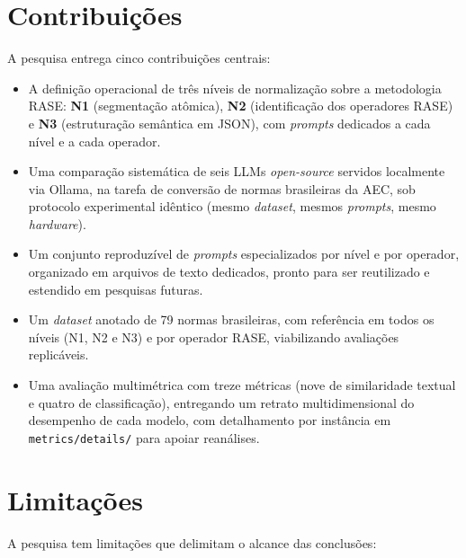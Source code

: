 \section{Contribuições}

A pesquisa entrega cinco contribuições centrais:

\begin{itemize}
    \item A definição operacional de três níveis de normalização sobre a metodologia RASE: \textbf{N1} (segmentação atômica), \textbf{N2} (identificação dos operadores RASE) e \textbf{N3} (estruturação semântica em JSON), com \textit{prompts} dedicados a cada nível e a cada operador.
    \item Uma comparação sistemática de seis LLMs \textit{open-source} servidos localmente via Ollama, na tarefa de conversão de normas brasileiras da AEC, sob protocolo experimental idêntico (mesmo \textit{dataset}, mesmos \textit{prompts}, mesmo \textit{hardware}).
    \item Um conjunto reproduzível de \textit{prompts} especializados por nível e por operador, organizado em arquivos de texto dedicados, pronto para ser reutilizado e estendido em pesquisas futuras.
    \item Um \textit{dataset} anotado de 79 normas brasileiras, com referência em todos os níveis (N1, N2 e N3) e por operador RASE, viabilizando avaliações replicáveis.
    \item Uma avaliação multimétrica com treze métricas (nove de similaridade textual e quatro de classificação), entregando um retrato multidimensional do desempenho de cada modelo, com detalhamento por instância em \texttt{metrics/details/} para apoiar reanálises.
\end{itemize}

\section{Limitações}

A pesquisa tem limitações que delimitam o alcance das conclusões:


